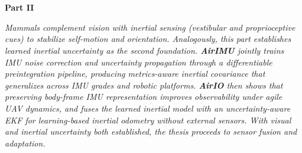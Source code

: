 \chapter*{} %
\begin{center}
    \vspace*{3.5cm} 
{\Huge \textbf{Part II} \\ [1cm]}
{\LARGE \textbf{\partIITitle}}
\end{center}

\vspace{2cm}

\begin{center}
\textit{Mammals complement vision with inertial sensing (vestibular and proprioceptive cues) to stabilize self-motion and orientation. Analogously, this part establishes learned inertial uncertainty as the second foundation. \textbf{AirIMU} jointly trains IMU noise correction and uncertainty propagation through a differentiable preintegration pipeline, producing metrics-aware inertial covariance that generalizes across IMU grades and robotic platforms. \textbf{AirIO} then shows that preserving body-frame IMU representation improves observability under agile UAV dynamics, and fuses the learned inertial model with an uncertainty-aware EKF for learning-based inertial odometry without external sensors. With visual and inertial uncertainty both established, the thesis proceeds to sensor fusion and adaptation.}
\end{center}
